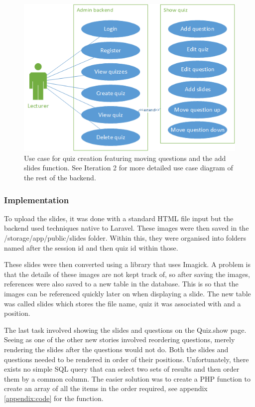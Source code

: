 \begin{figure}
	\caption{Use case for quiz creation featuring moving questions and the add slides function. See Iteration 2 for more detailed use case diagram of the rest of the backend.}
	\centerline{\includegraphics{Chapter2/Iter-7/iter-7-use-case}}
	\label{fig:iter-7-use-case}
\end{figure}

\subsubsection{Implementation}
To upload the slides, it was done with a standard HTML file input but the backend used techniques native to Laravel\cite{laravel-saving-files}. These images were then saved in the /storage/app/public/slides folder. Within this, they were organised into folders named after the session id and then quiz id within those.

These slides were then converted using a library that uses Imagick\cite{spatie-pdf-converter}. A problem is that the details of these images are not kept track of, so after saving the images, references were also saved to a new table in the database. This is so that the images can be referenced quickly later on when displaying a slide. The new table was called slides which stores the file name, quiz it was associated with and a position. 

The last task involved showing the slides and questions on the Quiz.show page. Seeing as one of the other new stories involved reordering questions, merely rendering the slides after the questions would not do. Both the slides and questions needed to be rendered in order of their positions. Unfortunately, there exists no simple SQL query that can select two sets of results and then order them by a common column. The easier solution was to create a PHP function to create an array of all the items in the order required, see appendix \ref{appendix:code} for the function.
